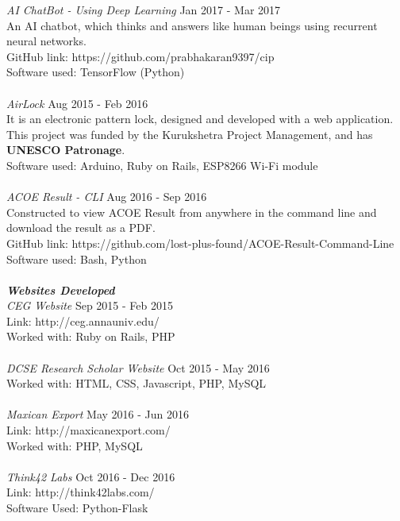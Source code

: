 \documentclass[margin, 10pt]{res} %
\begin{document}
\begin{resume}
{\sl AI ChatBot - Using Deep Learning} \hfill Jan 2017 - Mar 2017 \\
An AI chatbot, which thinks and answers like human beings using recurrent neural networks. \\
GitHub link: https://github.com/prabhakaran9397/cip \\
Software used: TensorFlow (Python) \\
\\
{\sl AirLock} \hfill Aug 2015 - Feb 2016 \\
It is an electronic pattern lock, designed and developed with a web application. This project was funded by the Kurukshetra Project Management, and has \textbf{UNESCO Patronage}.\\ 
Software used: Arduino, Ruby on Rails, ESP8266 Wi-Fi module \\
\\
{\sl ACOE Result - CLI} \hfill Aug 2016 - Sep 2016 \\
Constructed to view ACOE Result from anywhere in the command line and download the result as a PDF. \\
GitHub link: https://github.com/lost-plus-found/ACOE-Result-Command-Line \\
Software used: Bash, Python \\
\\
{\sl \textbf{Websites Developed}}\\
{\sl CEG Website} \hfill Sep 2015 - Feb 2015 \\
Link: http://ceg.annauniv.edu/ \\
Worked with: Ruby on Rails, PHP \\
\\ 
{\sl DCSE Research Scholar Website} \hfill Oct 2015 - May 2016 \\
Worked with: HTML, CSS, Javascript, PHP, MySQL  \\
\\
{\sl Maxican Export} \hfill May 2016 - Jun 2016 \\
Link: http://maxicanexport.com/ \\
Worked with: PHP, MySQL \\
\\
{\sl Think42 Labs} \hfill Oct 2016 - Dec 2016 \\
Link: http://think42labs.com/ \\
Software Used: Python-Flask



\end{resume}
\end{document}
